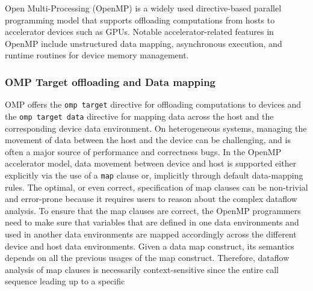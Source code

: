 Open Multi-Processing (OpenMP) is a widely used directive-based parallel programming model
that  supports offloading computations from hosts to accelerator devices such as GPUs. 
Notable accelerator-related features 
in OpenMP include unstructured data
mapping, asynchronous execution, and runtime routines for device
memory management. 
\subsubsection{OMP Target offloading and Data mapping}
OMP offers the \texttt{omp target} directive 
for offloading computations to devices and the \texttt{omp target data}
directive for mapping data across the host and the corresponding
device data environment.
On heterogeneous systems, managing the movement of data between the host and the device can be challenging, and is often a major source of performance and correctness bugs. 
In the OpenMP accelerator model, 
data movement between device and host 
is supported either explicitly via the use of a \texttt{map} clause 
or, implicitly through default data-mapping rules. 
The optimal, or even correct, specification of map clauses can be non-trivial and error-prone because it requires users to reason about the complex dataflow analysis. 
To ensure that the map clauses are correct, the OpenMP programmers 
need to make sure that variables that are defined in one data environments and used in another data environments are mapped accordingly across 
the different device and host data environments. 
Given a data map construct, its semantics depends on all the previous usages of the map construct.
Therefore, dataflow analysis of map clauses is necessarily 
context-sensitive since the entire call sequence leading up to a specific 
